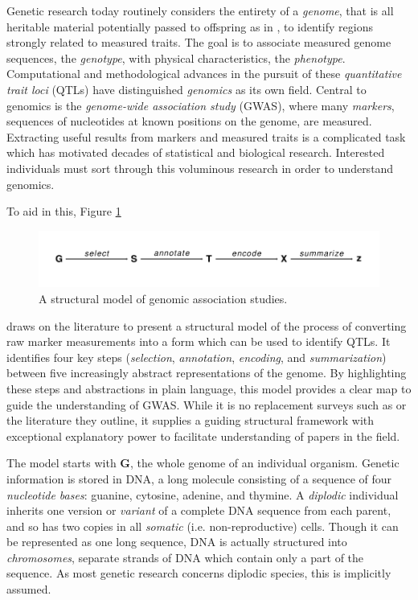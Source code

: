 \documentclass[sts]{imsart}
\newcommand{\m}[1]{\mathbf{#1}}               %
\begin{document}
Genetic research today routinely considers the entirety of a \emph{genome}, that is all heritable material potentially passed to offspring as in \cite{doergeetal1997search}, to identify regions strongly related to measured traits. The goal is to associate measured genome sequences, the \emph{genotype}, with physical characteristics, the \emph{phenotype}. Computational and methodological advances in the pursuit of these \emph{quantitative trait loci} (QTLs) have distinguished \emph{genomics} as its own field. Central to genomics is the \emph{genome-wide association study} (GWAS), where many \emph{markers}, sequences of nucleotides at known positions on the genome, are measured. Extracting useful results from markers and measured traits is a complicated task which has motivated decades of statistical and biological research. Interested individuals must sort through this voluminous research in order to understand genomics.

To aid in this, Figure \ref{fig:modelDiagram}
\begin{figure}[h]
  \begin{center}
  \includegraphics[scale = 1]{../img/modelDiagram.pdf}
  \caption{A structural model of genomic association
    studies.} \label{fig:modelDiagram}
  \end{center}
\end{figure}
draws on the literature to present a structural model of the process of converting raw marker measurements into a form which can be used to identify QTLs. It identifies four key steps (\emph{selection}, \emph{annotation}, \emph{encoding}, and \emph{summarization}) between five increasingly abstract representations of the genome. By highlighting these steps and abstractions in plain language, this model provides a clear map to guide the understanding of GWAS. While it is no replacement surveys such as \cite{uffelmannetal2021gwas, tametal2019benefits} or the literature they outline, it supplies a guiding structural framework with exceptional explanatory power to facilitate understanding of papers in the field.

The model starts with $\m{G}$, the whole genome of an individual organism. Genetic information is stored in DNA, a long molecule consisting of a sequence of four \emph{nucleotide bases}: guanine, cytosine, adenine, and thymine. A \emph{diplodic} individual inherits one version or \emph{variant} of a complete DNA sequence from each parent, and so has two copies in all \emph{somatic} (i.e. non-reproductive) cells. Though it can be represented as one long sequence, DNA is actually structured into \emph{chromosomes}, separate strands of DNA which contain only a part of the sequence. As most genetic research concerns diplodic species, this is implicitly assumed.
\end{document}
